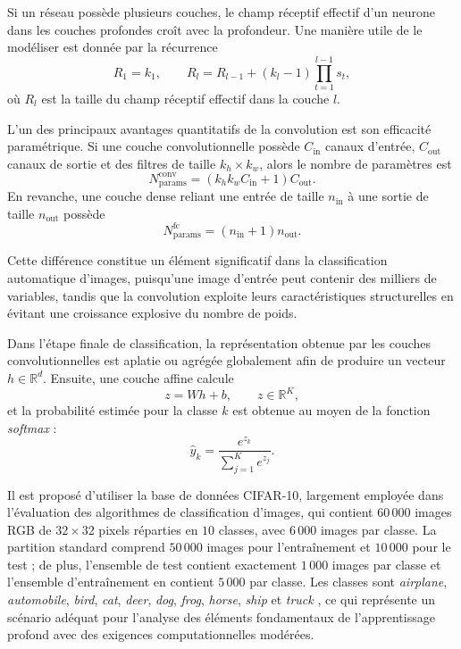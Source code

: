 \documentclass[conference]{IEEEtran}
\begin{document}
Si un réseau possède plusieurs couches, le champ réceptif effectif d’un neurone dans les couches profondes croît avec la profondeur. Une manière utile de le modéliser est donnée par la récurrence
\begin{equation}
R_1=k_1,
\qquad
R_l=R_{l-1}+(k_l-1)\prod_{t=1}^{l-1}s_t,
\label{eq:receptive_field}
\end{equation}
où $R_l$ est la taille du champ réceptif effectif dans la couche $l$.

L’un des principaux avantages quantitatifs de la convolution est son efficacité paramétrique. Si une couche convolutionnelle possède $C_{\text{in}}$ canaux d’entrée, $C_{\text{out}}$ canaux de sortie et des filtres de taille $k_h\times k_w$, alors le nombre de paramètres est
\begin{equation}
N_{\text{params}}^{\text{conv}}
=
\left(k_hk_wC_{\text{in}}+1\right)C_{\text{out}}.
\label{eq:conv_params}
\end{equation}
En revanche, une couche dense reliant une entrée de taille $n_{\text{in}}$ à une sortie de taille $n_{\text{out}}$ possède
\begin{equation}
N_{\text{params}}^{\text{fc}}
=
\left(n_{\text{in}}+1\right)n_{\text{out}}.
\label{eq:fc_params}
\end{equation}

Cette différence constitue un élément significatif dans la classification automatique d’images, puisqu’une image d’entrée peut contenir des milliers de variables, tandis que la convolution exploite leurs caractéristiques structurelles en évitant une croissance explosive du nombre de poids.

Dans l’étape finale de classification, la représentation obtenue par les couches convolutionnelles est aplatie ou agrégée globalement afin de produire un vecteur $h\in\mathbb{R}^{d}$. Ensuite, une couche affine calcule
\begin{equation}
z=Wh+b,
\qquad
z\in\mathbb{R}^{K},
\label{eq:affine_classifier}
\end{equation}
et la probabilité estimée pour la classe $k$ est obtenue au moyen de la fonction \textit{softmax} :
\begin{equation}
\hat{y}_k=
\frac{e^{z_k}}{\sum_{j=1}^{K}e^{z_j}}.
\label{eq:softmax}
\end{equation}
\cite{lecun_convolutional_networks}

Il est proposé d’utiliser la base de données CIFAR-10, largement employée dans l’évaluation des algorithmes de classification d’images, qui contient $60\,000$ images RGB de $32\times 32$ pixels réparties en $10$ classes, avec $6\,000$ images par classe. La partition standard comprend $50\,000$ images pour l’entraînement et $10\,000$ pour le test ; de plus, l’ensemble de test contient exactement $1\,000$ images par classe et l’ensemble d’entraînement en contient $5\,000$ par classe. Les classes sont \textit{airplane}, \textit{automobile}, \textit{bird}, \textit{cat}, \textit{deer}, \textit{dog}, \textit{frog}, \textit{horse}, \textit{ship} et \textit{truck} \cite{cifar10_dataset}, ce qui représente un scénario adéquat pour l’analyse des éléments fondamentaux de l’apprentissage profond avec des exigences computationnelles modérées.
\end{document}
